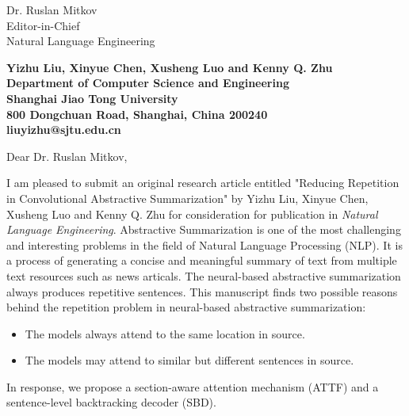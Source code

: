 \documentclass[11pt]{letter} %
\begin{document}

\begin{letter}{Dr. Ruslan Mitkov \\
Editor-in-Chief  \\
Natural Language Engineering} 


\begin{center}
\large\bf Yizhu Liu, Xinyue Chen, Xusheng Luo and Kenny Q. Zhu \\ %
Department of Computer Science and Engineering \\ Shanghai Jiao Tong University \\ 800 Dongchuan Road, Shanghai, China 200240 \\
liuyizhu@sjtu.edu.cn
\end{center} 
\vfill

\signature{Yizhu Liu} %


\opening{Dear Dr. Ruslan Mitkov,} 

I am pleased to submit an original research article entitled 
"Reducing Repetition in Convolutional Abstractive Summarization" by Yizhu Liu, Xinyue Chen, Xusheng Luo and Kenny Q. Zhu 
for consideration for publication in \textit{Natural Language Engineering}. 
Abstractive Summarization is one of the most challenging and interesting problems 
in the field of Natural Language Processing (NLP). 
It is a process of generating a concise and meaningful summary of text from multiple text resources 
such as news articals.
The neural-based abstractive summarization always produces repetitive sentences.
This manuscript finds two possible reasons behind the repetition problem in neural-based abstractive summarization: 
\begin{itemize}
\item The models always attend to the same location in source.
\item The models may attend to similar but different sentences in source. 
\end{itemize}
In response, we propose a section-aware attention mechanism (ATTF) and a sentence-level backtracking decoder (SBD).


\end{letter}
\end{document}
